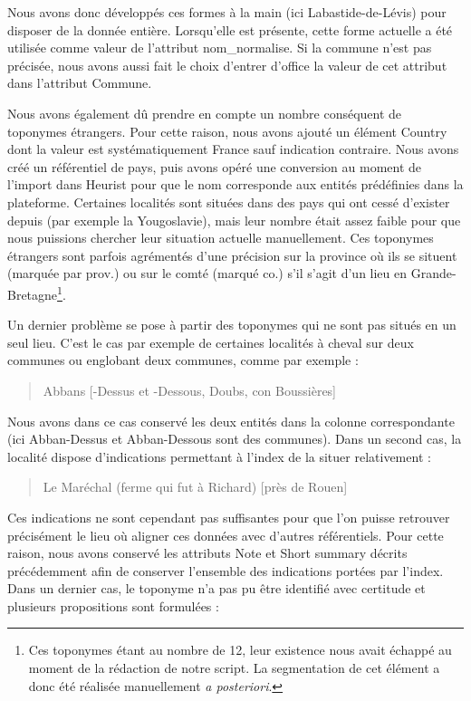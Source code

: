 \documentclass[a4paper,12pt,twoside]{book}
\begin{document}
	\noindent Nous avons donc développés ces formes à la main (ici \og Labastide-de-Lévis\fg{}) pour disposer de la donnée entière. Lorsqu'elle est présente, cette forme actuelle a été utilisée comme valeur de l'attribut \og nom\_normalise\fg{}. Si la commune n'est pas précisée, nous avons aussi fait le choix d'entrer d'office la valeur de cet attribut dans l'attribut \og Commune\fg{}.
	
	Nous avons également dû prendre en compte un nombre conséquent de toponymes étrangers. Pour cette raison, nous avons ajouté un élément \og Country\fg{} dont la valeur est systématiquement \og France\fg{} sauf indication contraire. Nous avons créé un référentiel de pays, puis avons opéré une conversion au moment de l'import dans Heurist pour que le nom corresponde aux entités prédéfinies dans la plateforme. Certaines localités sont situées dans des pays qui ont cessé d'exister depuis (par exemple la Yougoslavie), mais leur nombre était assez faible pour que nous puissions chercher leur situation actuelle manuellement. Ces toponymes étrangers sont parfois agrémentés d'une précision sur la province où ils se situent (marquée par \og prov.\fg{}) ou sur le comté (marqué \og co.\fg{}) s'il s'agit d'un lieu en Grande-Bretagne\footnote{Ces toponymes étant au nombre de 12, leur existence nous avait échappé au moment de la rédaction de notre script. La segmentation de cet élément a donc été réalisée manuellement \textit{a posteriori}.}.
	
	Un dernier problème se pose à partir des toponymes qui ne sont pas situés en un seul lieu. C'est le cas par exemple de certaines localités à cheval sur deux communes ou englobant deux communes, comme par exemple :
	
	\begin{quotation}
		Abbans [-Dessus et -Dessous, Doubs, con Boussières]
	\end{quotation}
	
	\noindent Nous avons dans ce cas conservé les deux entités dans la colonne correspondante (ici \og Abban-Dessus\fg{} et \og Abban-Dessous\fg{} sont des communes). Dans un second cas, la localité dispose d'indications permettant à l'index de la situer relativement :
	
	\begin{quotation}
		Le Maréchal (ferme qui fut à Richard) [près de Rouen]
	\end{quotation}
	
	\noindent Ces indications ne sont cependant pas suffisantes pour que l'on puisse retrouver précisément le lieu où aligner ces données avec d'autres référentiels. Pour cette raison, nous avons conservé les attributs \og Note\fg{} et \og Short summary\fg{} décrits précédemment afin de conserver l'ensemble des indications portées par l'index. Dans un dernier cas, le toponyme n'a pas pu être identifié avec certitude et plusieurs propositions sont formulées :
	
\end{document}
